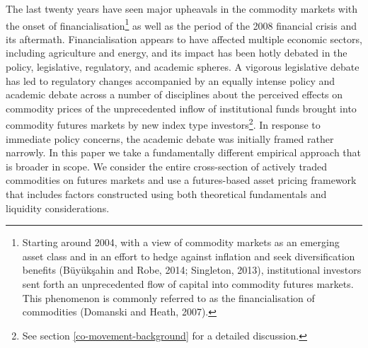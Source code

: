 \documentclass[]{elsarticle} %
\begin{document}
The last twenty years have seen major upheavals in the commodity markets with the onset of financialisation\footnote{Starting around 2004, with a view of commodity markets as an emerging asset class and in an effort to hedge against inflation and seek diversification benefits (Büyükşahin and Robe, 2014; Singleton, 2013), institutional investors sent forth an unprecedented flow of capital into commodity futures markets. This phenomenon is commonly referred to as the financialisation of commodities (Domanski and Heath, 2007).} as well as the period of the 2008 financial crisis and its aftermath. Financialisation appears to have affected multiple economic sectors, including agriculture and energy, and its impact has been hotly debated in the policy, legislative, regulatory, and academic spheres. A vigorous legislative debate has led to regulatory changes accompanied by an equally intense policy and academic debate across a number of disciplines about the perceived effects on commodity prices of the unprecedented inflow of institutional funds brought into commodity futures markets by new index type investors\footnote{See section \ref{co-movement-background} for a detailed discussion.}. In response to immediate policy concerns, the academic debate was initially framed rather narrowly. In this paper we take a fundamentally different empirical approach that is broader in scope. We consider the entire cross-section of actively traded commodities on futures markets and use a futures-based asset pricing framework that includes factors constructed using both theoretical fundamentals and liquidity considerations.\\
\end{document}
